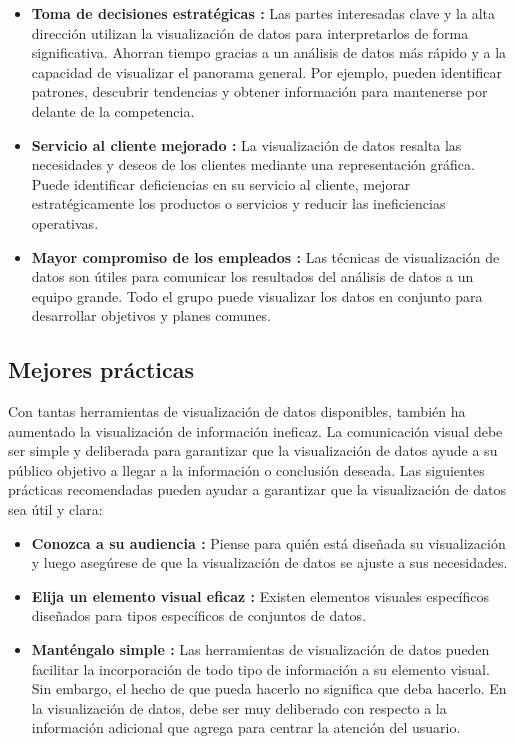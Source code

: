 \begin{itemize}
  \item {\textbf{Toma de decisiones estratégicas :}} Las partes interesadas
  clave y la alta dirección utilizan la visualización de datos para interpretarlos
  de forma significativa. Ahorran tiempo gracias a un análisis de datos más
  rápido y a la capacidad de visualizar el panorama general. Por ejemplo,
  pueden identificar patrones, descubrir tendencias y obtener información
  para mantenerse por delante de la competencia.
  \item {\textbf{Servicio al cliente mejorado :}} La visualización de datos
  resalta las necesidades y deseos de los clientes mediante una representación
  gráfica. Puede identificar deficiencias en su servicio al cliente, mejorar
  estratégicamente los productos o servicios y reducir las ineficiencias operativas.
  \item {\textbf{Mayor compromiso de los empleados :}} Las técnicas de visualización
  de datos son útiles para comunicar los resultados del análisis de datos a un
  equipo grande. Todo el grupo puede visualizar los datos en conjunto para
  desarrollar objetivos y planes comunes.
\end{itemize}

\subsection{Mejores prácticas}
Con tantas herramientas de visualización de datos disponibles, también ha aumentado
la visualización de información ineficaz. La comunicación visual debe ser simple
y deliberada para garantizar que la visualización de datos ayude a su público
objetivo a llegar a la información o conclusión deseada. Las siguientes prácticas
recomendadas pueden ayudar a garantizar que la visualización de datos sea útil
y clara:

\begin{itemize}
  \item {\textbf{Conozca a su audiencia :}} Piense para quién está diseñada su
  visualización y luego asegúrese de que la visualización de datos se ajuste a
  sus necesidades.
  \item {\textbf{Elija un elemento visual eficaz :}} Existen elementos visuales
  específicos diseñados para tipos específicos de conjuntos de datos.
  \item {\textbf{Manténgalo simple :}} Las herramientas de visualización de datos
  pueden facilitar la incorporación de todo tipo de información a su elemento visual.
  Sin embargo, el hecho de que pueda hacerlo no significa que deba hacerlo. En la
  visualización de datos, debe ser muy deliberado con respecto a la información
  adicional que agrega para centrar la atención del usuario.
\end{itemize}